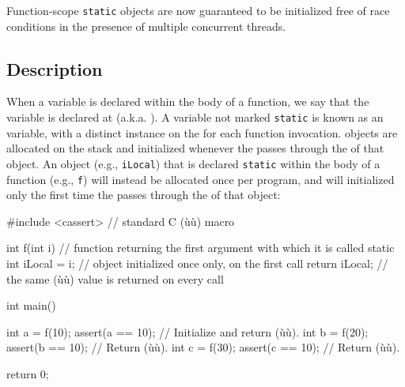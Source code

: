 


\setcounter{table}{0}
\setcounter{footnote}{0}
\setcounter{lstlisting}{0}


Function-scope \lstinline!static! objects are now guaranteed to be
initialized free of race conditions in the presence
of multiple concurrent threads.

\subsection[Description]{Description}\label{description-functionstatic}

When a variable is declared within the body of a function, we say that
the variable is declared at  (a.k.a.
).  A variable not marked \lstinline!static! is known as
an  variable, with a distinct instance on the
 for each function invocation.   objects
are allocated on the stack and initialized whenever the 
passes through the  of that object.
An object (e.g., \lstinline!iLocal!) that is
declared \lstinline!static! within the body of a function (e.g.,
\lstinline!f!) will instead be allocated once per program, and will initialized
only the first time the  passes
through the  of that object:

\begin{emcppslisting}
#include <cassert>  // standard C (ù{}ù) macro

int f(int i) // function returning the first argument with which it is called
{
    static int iLocal = i;  // object initialized once only, on the first call
    return iLocal;          // the same (ù{}ù) value is returned on every call
}

int main()
{
    int a = f(10);  assert(a == 10);  // Initialize and return (ù{}ù).
    int b = f(20);  assert(b == 10);  // Return (ù{}ù).
    int c = f(30);  assert(c == 10);  // Return (ù{}ù).

    return 0;
}
\end{emcppslisting}

